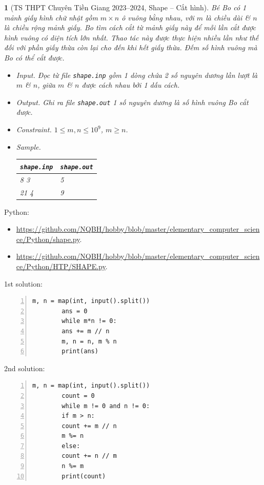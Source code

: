 \documentclass{article}
\newtheorem{baitoan}{}
\begin{document}
\begin{baitoan}[TS THPT Chuyên Tiền Giang 2023--2024, Shape -- Cắt hình]
	Bé Bo có 1 mảnh giấy hình chữ nhật gồm $m\times n$ ô vuông bằng nhau, với $m$ là chiều dài \& $n$ là chiều rộng mảnh giấy. Bo tìm cách cắt từ mảnh giấy này để mỗi lần cắt được hình vuông có diện tích lớn nhất. Thao tác này được thực hiện nhiều lần như thế đối với phần giấy thừa còn lại cho đến khi hết giấy thừa. Đếm số hình vuông mà Bo có thể cắt được.
	\begin{itemize}
		\item {\sf Input.} Đọc từ file {\tt shape.inp} gồm 1 dòng chứa 2 số nguyên dương lần lượt là $m$ \& $n$, giữa $m$ \& $n$ được cách nhau bởi 1 dấu cách.
		\item {\sf Output.} Ghi ra file {\tt shape.out} 1 số nguyên dương là số hình vuông Bo cắt được.
		\item {\sf Constraint.} $1\le m,n\le10^9$, $m\ge n$.
		\item {\sf Sample.}
		\begin{table}[H]
			\centering
			\begin{tabular}{|l|l|}
				\hline
				{\tt shape.inp} & {\tt shape.out} \\
				\hline
				8 3 & 5 \\
				\hline
				21 4 & 9 \\
				\hline
			\end{tabular}
		\end{table}
	\end{itemize}
\end{baitoan}
Python:
\begin{itemize}
	\item \url{https://github.com/NQBH/hobby/blob/master/elementary_computer_science/Python/shape.py}.
	\item \url{https://github.com/NQBH/hobby/blob/master/elementary_computer_science/Python/HTP/SHAPE.py}.
\end{itemize}

\begin{multicols}{2}
	1st solution:
	\begin{Verbatim}[numbers=left,xleftmargin=5mm]
		m, n = map(int, input().split())
		ans = 0
		while m*n != 0:
		ans += m // n
		m, n = n, m % n
		print(ans)
	\end{Verbatim}
	\vfill
	\columnbreak
	2nd solution:
	\begin{Verbatim}[numbers=left,xleftmargin=5mm]
		m, n = map(int, input().split())
		count = 0
		while m != 0 and n != 0:
		if m > n:
		count += m // n
		m %= n
		else:
		count += n // m
		n %= m
		print(count)
	\end{Verbatim}
\end{multicols}
\end{document}
